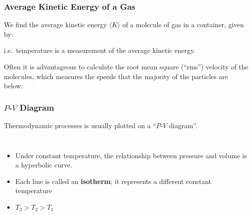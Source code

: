 \documentclass[12pt,aspectratio=169]{beamer}
\newcommand{\eq}[2]{\vspace{#1}{\Large\begin{displaymath}#2\end{displaymath}}}
\begin{document}
\begin{frame}
  \frametitle{Average Kinetic Energy of a Gas}
  We find the average kinetic energy $\langle K \rangle$ of a molecule of gas
  in a container, given by:
  
  \eq{-.2in}{
    \boxed{\big\langle K\big\rangle=\frac{3}{2}kT}
  }

  \vspace{-.1in}i.e.\ temperature is a measurement of the average kinetic
  energy.

  \vspace{.15in}Often it is advantageous to calculate the root mean square
  (``rms'') velocity of the molecules, which measures the speeds that the
  majority of the particles are below:

  \eq{-.2in}{
    v_\mathrm{rms}=\sqrt{\frac{3kT}{m}}
  }
\end{frame}


\begin{frame}
  \frametitle{$P$-$V$ Diagram}
  Thermodynamic processes is usually plotted on a ``$P$-$V$ diagram''.
  \begin{columns}


    \begin{itemize}
    \item Under constant temperature, the relationship between pressure and
      volume is a hyperbolic curve.
    \item Each line is called an \textbf{isotherm}; it represents a different
      constant temperature
    \item $T_3>T_2>T_1$
    \end{itemize}
  \end{columns}
  
\end{frame}
\end{document}
